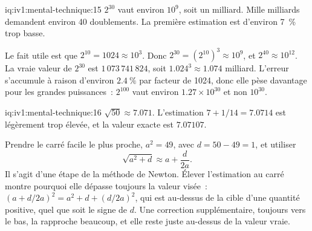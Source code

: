 \begin{solution}{iq:iv1:mental-technique:15}
$2^{30}$ vaut environ $10^9$, soit un milliard. Mille milliards demandent environ 40 doublements. La première estimation est d'environ 7~\% trop basse.

Le fait utile est que $2^{10} = 1024 \approx 10^3$. Donc $2^{30} = (2^{10})^3 \approx 10^9$, et $2^{40} \approx 10^{12}$. La vraie valeur de $2^{30}$ est $1\,073\,741\,824$, soit $1.024^3 \approx 1.074$ milliard. L'erreur s'accumule à raison d'environ $2.4~\%$ par facteur de 1024, donc elle pèse davantage pour les grandes puissances~: $2^{100}$ vaut environ $1.27 \times 10^{30}$ et non $10^{30}$.

\end{solution}

\begin{solution}{iq:iv1:mental-technique:16}
$\sqrt{50} \approx 7.071$. L'estimation $7 + 1/14 = 7.0714$ est légèrement trop élevée, et la valeur exacte est $7.07107$.

Prendre le carré facile le plus proche, $a^2 = 49$, avec $d = 50 - 49 = 1$, et utiliser
\[
\sqrt{a^2 + d} \approx a + \frac{d}{2a}.
\]
Il s'agit d'une étape de la méthode de Newton. Élever l'estimation au carré montre pourquoi elle dépasse toujours la valeur visée~: $(a + d/2a)^2 = a^2 + d + (d/2a)^2$, qui est au-dessus de la cible d'une quantité positive, quel que soit le signe de $d$. Une correction supplémentaire, toujours vers le bas, la rapproche beaucoup, et elle reste juste au-dessus de la valeur vraie.

\end{solution}

